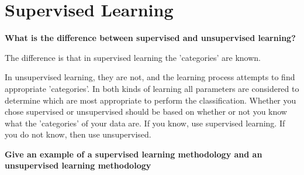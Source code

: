 \documentclass[a4paper,12pt]{article}
\begin{document}
\section{Supervised Learning}


\textbf{What is the difference between supervised and unsupervised learning?}

The difference is that in supervised learning the 'categories' are known.

In unsupervised learning, they are not, and the learning process attempts to find appropriate 'categories'. In both kinds of learning all parameters are considered to determine which are most appropriate to perform the classification.
Whether you chose supervised or unsupervised should be based on whether or not you know what the
'categories' of your data are. If you know, use supervised learning. If you do not know, then use
unsupervised.


\textbf{Give an example of a supervised learning methodology and an unsupervised learning methodology}
\end{document}
